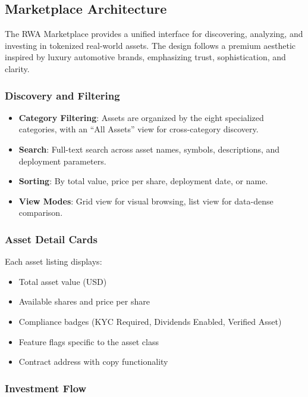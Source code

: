 \documentclass[11pt,a4paper,twoside]{article}
\begin{document}
\subsection{Marketplace Architecture}

The RWA Marketplace provides a unified interface for discovering, analyzing, and investing in tokenized real-world assets. The design follows a premium aesthetic inspired by luxury automotive brands, emphasizing trust, sophistication, and clarity.

\subsubsection{Discovery and Filtering}

\begin{itemize}
  \item \textbf{Category Filtering}: Assets are organized by the eight specialized categories, with an ``All Assets'' view for cross-category discovery.
  \item \textbf{Search}: Full-text search across asset names, symbols, descriptions, and deployment parameters.
  \item \textbf{Sorting}: By total value, price per share, deployment date, or name.
  \item \textbf{View Modes}: Grid view for visual browsing, list view for data-dense comparison.
\end{itemize}

\subsubsection{Asset Detail Cards}

Each asset listing displays:
\begin{itemize}
  \item Total asset value (USD)
  \item Available shares and price per share
  \item Compliance badges (KYC Required, Dividends Enabled, Verified Asset)
  \item Feature flags specific to the asset class
  \item Contract address with copy functionality
\end{itemize}

\subsubsection{Investment Flow}
\end{document}

